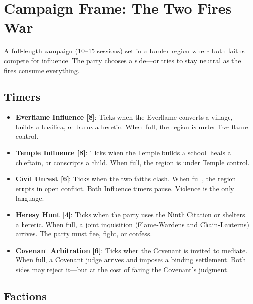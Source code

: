\documentclass{book}
\begin{document}
\chapter{Campaign Frame: The Two Fires War}

A full-length campaign (10--15 sessions) set in a border region where both faiths compete for influence. The party chooses a side---or tries to stay neutral as the fires consume everything.

\section{Timers}

\begin{itemize}
\item \textbf{Everflame Influence [8]}: Ticks when the Everflame converts a village, builds a basilica, or burns a heretic. When full, the region is under Everflame control.
\item \textbf{Temple Influence [8]}: Ticks when the Temple builds a school, heals a chieftain, or conscripts a child. When full, the region is under Temple control.
\item \textbf{Civil Unrest [6]}: Ticks when the two faiths clash. When full, the region erupts in open conflict. Both Influence timers pause. Violence is the only language.
\item \textbf{Heresy Hunt [4]}: Ticks when the party uses the Ninth Citation or shelters a heretic. When full, a joint inquisition (Flame-Wardens and Chain-Lanterns) arrives. The party must flee, fight, or confess.
\item \textbf{Covenant Arbitration [6]}: Ticks when the Covenant is invited to mediate. When full, a Covenant judge arrives and imposes a binding settlement. Both sides may reject it---but at the cost of facing the Covenant's judgment.
\end{itemize}

\section{Factions}
\end{document}
